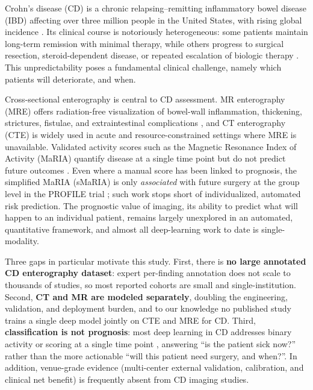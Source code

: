 \documentclass[11pt]{article}
\begin{document}
Crohn's disease (CD) is a chronic relapsing--remitting inflammatory bowel disease (IBD)
affecting over three million people in the United States, with rising global incidence
\cite{torres2017crohns}. Its clinical course is notoriously heterogeneous: some patients
maintain long-term remission with minimal therapy, while others progress to surgical
resection, steroid-dependent disease, or repeated escalation of biologic therapy
\cite{peyrin2017lancet}. This unpredictability poses a fundamental clinical challenge,
namely which patients will deteriorate, and when.

Cross-sectional enterography is central to CD assessment. MR enterography (MRE) offers
radiation-free visualization of bowel-wall inflammation, thickening, strictures, fistulae,
and extraintestinal complications \cite{defined_mri_cd}, and CT enterography (CTE) is widely
used in acute and resource-constrained settings where MRE is unavailable. Validated activity
scores such as the Magnetic Resonance Index of Activity (MaRIA) quantify disease at a single
time point but do not predict future outcomes \cite{defined_maria}. Even where a manual score
has been linked to prognosis, the simplified MaRIA (sMaRIA) is only \emph{associated} with
future surgery at the group level in the PROFILE trial \cite{bhandari2026smaria}; such work
stops short of individualized, automated risk prediction. The prognostic value of imaging, its
ability to predict what will happen to an individual patient, remains largely unexplored in an
automated, quantitative framework, and almost all deep-learning work to date is single-modality.

Three gaps in particular motivate this study. First, there is \textbf{no large annotated CD
enterography dataset}: expert per-finding annotation does not scale to thousands of studies, so
most reported cohorts are small and single-institution. Second, \textbf{CT and MR are modeled
separately}, doubling the engineering, validation, and deployment burden, and to our knowledge
no published study trains a single deep model jointly on CTE and MRE for CD. Third,
\textbf{classification is not prognosis}: most deep learning in CD addresses binary activity or
scoring at a single time point \cite{dl_ibd_review}, answering ``is the patient sick now?''
rather than the more actionable ``will this patient need surgery, and when?''. In addition,
venue-grade evidence (multi-center external validation, calibration, and clinical net benefit)
is frequently absent from CD imaging studies.
\end{document}
